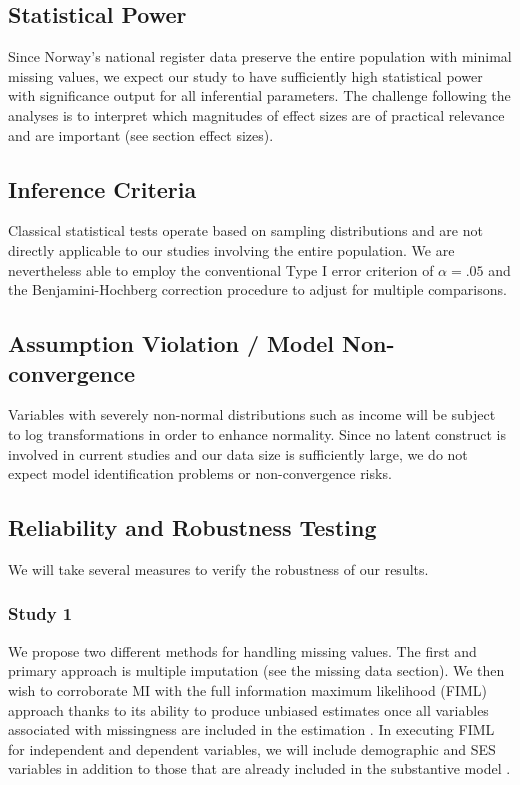 \subsection{Statistical Power}

Since Norway's national register data preserve the entire population with minimal missing values, we expect our study to have sufficiently high statistical power with significance output for all inferential parameters. The challenge following the analyses is to interpret which magnitudes of effect sizes are of practical relevance and are important (see section effect sizes).

\subsection{Inference Criteria}

Classical statistical tests operate based on sampling distributions and are not directly applicable to our studies involving the entire population. We are nevertheless able to employ the conventional Type I error criterion of $\alpha = .05$ and the Benjamini-Hochberg correction \parencite{benjamini:1995} procedure to adjust for multiple comparisons.

\subsection{Assumption Violation / Model Non-convergence}

Variables with severely non-normal distributions such as income will be subject to log transformations in order to enhance normality. Since no latent construct is involved in current studies and our data size is sufficiently large, we do not expect model identification problems or non-convergence risks.

\subsection{Reliability and Robustness Testing}

We will take several measures to verify the robustness of our results.

\subsubsection{Study 1}

We propose two different methods for handling missing values. The first and primary approach is multiple imputation (see the missing data section). We then wish to corroborate MI with the full information maximum likelihood (FIML) approach \parencite{graham:2012,vanbuuren:2018} thanks to its ability to produce unbiased estimates once all variables associated with missingness are included in the estimation \parencite{graham:2012,schafer:2002}. In executing FIML for independent and dependent variables, we will include demographic and SES variables in addition to those that are already included in the substantive model \parencite[saturated correlates models, ][]{graham:2003}.

